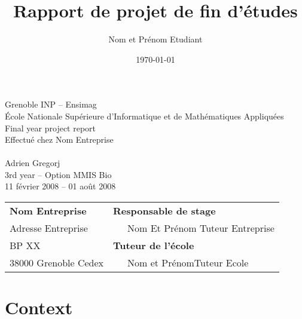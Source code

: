 \documentclass[12pt,a4paper,twoside]{article}
\title{Rapport de projet de fin d'études}
\author{Nom et Prénom Etudiant}
\date{\today}
\begin{document}
\lstset{ numbers=left, tabsize=3, frame=single, numberstyle=\ttfamily, basicstyle=\footnotesize} 
\thispagestyle{empty}

\begin{center}
Grenoble INP  -- Ensimag\\
École Nationale Supérieure d'Informatique et de Mathématiques Appliquées\\
\vspace{3cm}
{\LARGE Final year project report}\\
\vspace{1cm}
Effectué chez Nom Entreprise\\
\vspace{2cm}
\\
\vspace{3cm}
Adrien Gregorj\\
3rd year -- Option MMIS Bio\\
\vspace{3mm}
11 février 2008 -- 01 août 2008\\
\vspace{4cm}
\begin{tabular}{p{10cm}p{10cm}}
{\bf Nom Entreprise}                                            &{\bf Responsable de stage}\\
{\footnotesize Adresse Entreprise}       & ~~~Nom Et Prénom Tuteur Entreprise\\
{\footnotesize BP XX}                                        & {\bf Tuteur de l'école}\\
{\footnotesize 38000 Grenoble Cedex}                          & ~~~Nom et PrénomTuteur Ecole\\
\end{tabular}
\end{center}
\newpage

\tableofcontents

\newpage

\section{Context}
\end{document}
